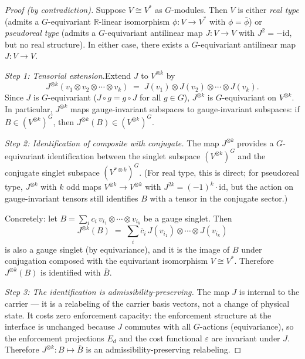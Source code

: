 \documentclass[11pt,a4paper]{article}
\theoremstyle{definition}
\begin{document}
\begin{proof}[Proof (by contradiction)]

Suppose $V \cong V^*$ as $G$-modules.  Then $V$ is either \emph{real type}
(admits a $G$-equivariant $\mathbb{R}$-linear isomorphism $\phi: V \to V^*$
with $\phi = \bar\phi$) or \emph{pseudoreal type} (admits a $G$-equivariant
antilinear map $J: V \to V$ with $J^2 = -\mathrm{id}$, but no real structure).
In either case, there exists a $G$-equivariant antilinear map
$J: V \to V$.

\textit{Step 1: Tensorial extension.}\quad Extend $J$ to $V^{\otimes k}$ by
\[
  J^{\otimes k}(v_1 \otimes v_2 \otimes \cdots \otimes v_k)
  \;=\; J(v_1) \otimes J(v_2) \otimes \cdots \otimes J(v_k).
\]
Since $J$ is $G$-equivariant ($J \circ g = g \circ J$ for all $g \in G$),
$J^{\otimes k}$ is $G$-equivariant on $V^{\otimes k}$.  In particular,
$J^{\otimes k}$ maps gauge-invariant subspaces to gauge-invariant subspaces:
if $B \in (V^{\otimes k})^G$, then $J^{\otimes k}(B) \in (V^{\otimes k})^G$.

\textit{Step 2: Identification of composite with conjugate.}\quad
The map $J^{\otimes k}$ provides a $G$-equivariant identification between
the singlet subspace $(V^{\otimes k})^G$ and the conjugate singlet subspace
$(V^{*\otimes k})^G$.  (For real type, this is direct; for pseudoreal type,
$J^{\otimes k}$ with $k$ odd maps $V^{\otimes k} \to V^{\otimes k}$ with
$J^{2k} = (-1)^k \cdot \mathrm{id}$, but the action on gauge-invariant
tensors still identifies $B$ with a tensor in the conjugate sector.)

Concretely: let $B = \sum_i c_i\, v_{i_1} \otimes \cdots \otimes v_{i_k}$
be a gauge singlet.  Then
\[
  J^{\otimes k}(B)
  \;=\; \sum_i \bar{c}_i\, J(v_{i_1}) \otimes \cdots \otimes J(v_{i_k})
\]
is also a gauge singlet (by equivariance), and it is the image of $B$ under
conjugation composed with the equivariant isomorphism $V \cong V^*$.
Therefore $J^{\otimes k}(B)$ is identified with $\bar{B}$.

\textit{Step 3: The identification is admissibility-preserving.}\quad
The map $J$ is internal to the carrier --- it is a relabeling of the carrier
basis vectors, not a change of physical state.  It costs zero enforcement
capacity: the enforcement structure at the interface is unchanged because
$J$ commutes with all $G$-actions (equivariance), so the enforcement
projections $E_d$ and the cost functional $\varepsilon$ are invariant under
$J$.  Therefore $J^{\otimes k}: B \mapsto \bar{B}$ is an
admissibility-preserving relabeling.


\end{proof}
\end{document}
